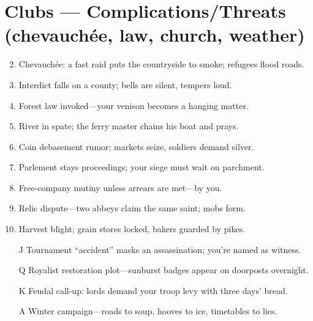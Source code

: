 \section*{Clubs --- Complications/Threats (chevauchée, law, church, weather)}
\begin{enumerate}
\setcounter{enumi}{1}
\item Chevauchée: a fast raid puts the countryside to smoke; refugees flood roads.
\item Interdict falls on a county; bells are silent, tempers loud.
\item Forest law invoked---your venison becomes a hanging matter.
\item River in spate; the ferry master chains his boat and prays.
\item Coin debasement rumor; markets seize, soldiers demand silver.
\item Parlement stays proceedings; your siege must wait on parchment.
\item Free-company mutiny unless arrears are met---by you.
\item Relic dispute---two abbeys claim the same saint; mobs form.
\item Harvest blight; grain stores locked, bakers guarded by pikes.
\item[J] Tournament ``accident'' masks an assassination; you're named as witness.
\item[Q] Royalist restoration plot---sunburst badges appear on doorposts overnight.
\item[K] Feudal call-up: lords demand your troop levy with three days' bread.
\item[A] Winter campaign---roads to soup, hooves to ice, timetables to lies.
\end{enumerate}

